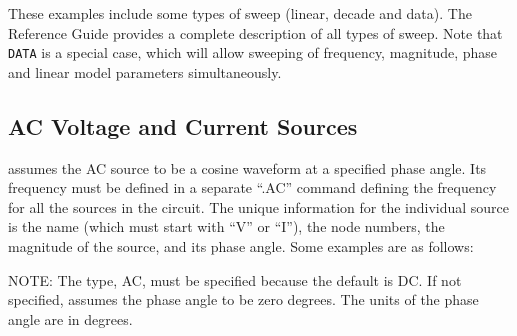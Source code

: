 These examples include some types of sweep (linear, decade and data).
The \Xyce{} Reference Guide\ReferenceGuide{} provides a complete
description of all types of sweep.  Note that \texttt{DATA} is a
special case, which will allow sweeping of frequency, magnitude, phase
and linear model parameters simultaneously.

\subsection{AC Voltage and Current Sources}
\label{AC_Sources}

\Xyce{} assumes the AC source to be a cosine waveform at a specified
phase angle. Its frequency must be defined in a separate ``.AC''
command defining the frequency for all the sources in the circuit. The
unique information for the individual source is the name (which must
start with ``V'' or ``I''), the node numbers, the magnitude of the
source, and its phase angle. Some examples are as follows:


NOTE: The type, AC, must be specified because the default is DC. If
not specified, \Xyce{} assumes the phase angle to be zero degrees.
The units of the phase angle are in degrees.

